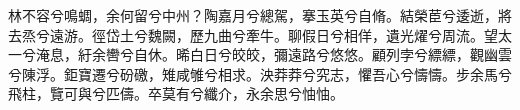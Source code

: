 
\begin{pinyinscope}
林不容兮鳴蜩，余何留兮中州？陶嘉月兮總駕，搴玉英兮自脩。結榮茞兮逶逝，將去烝兮遠游。徑岱土兮魏闕，歷九曲兮牽牛。聊假日兮相佯，遺光燿兮周流。望太一兮淹息，紆余轡兮自休。晞白日兮皎皎，彌遠路兮悠悠。顧列孛兮縹縹，觀幽雲兮陳浮。鉅寶遷兮砏礉，雉咸雊兮相求。泱莽莽兮究志，懼吾心兮懤懤。步余馬兮飛柱，覽可與兮匹儔。卒莫有兮纖介，永余思兮怞怞。


\end{pinyinscope}